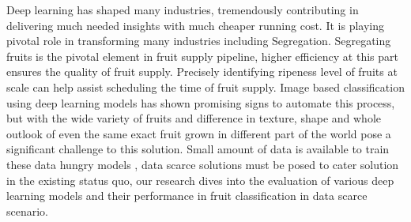 \documentclass[11pt]{article}
\begin{document}

Deep learning has shaped many industries, tremendously contributing in delivering much needed insights with much cheaper running cost. It is playing pivotal role in transforming many industries including Segregation. 
Segregating fruits is the pivotal element in fruit supply pipeline, higher efficiency at this part ensures the quality of fruit supply. Precisely identifying ripeness level of fruits at scale can help assist scheduling the time of fruit supply.
Image based classification using deep learning\cite{intro2} models has shown promising signs to automate this process, but with the wide variety of fruits and difference in texture, shape and whole outlook of even the same exact fruit grown in different part of the world pose a significant challenge to this solution.
Small amount of data is available to train these data hungry models \cite{intro3}, data scarce solutions must be posed to cater solution in the existing status quo, our research dives into the evaluation of various deep learning models and their performance in fruit classification in data scarce scenario.







\end{document}

